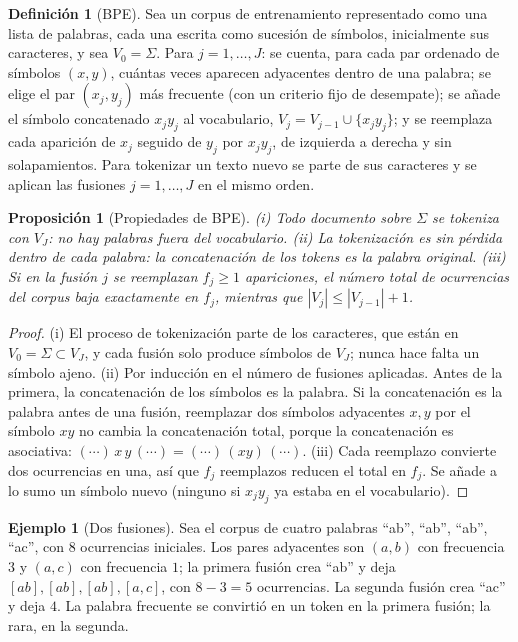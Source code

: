 \documentclass[11pt]{article}
\newtheorem{proposicion}[teorema]{Proposición}
\theoremstyle{definition}
\newtheorem{definicion}[teorema]{Definición}
\newtheorem{ejemplo}[teorema]{Ejemplo}
\theoremstyle{remark}
\newcommand{\abs}[1]{\left\lvert #1\right\rvert}
\begin{document}
\begin{definicion}[BPE]\label{def:bpe}
\noindent Sea un corpus de entrenamiento representado como una lista de palabras, cada una escrita como sucesión de símbolos, inicialmente sus caracteres, y sea $V_0=\Sigma$. Para $j=1,\dots,J$: se cuenta, para cada par ordenado de símbolos $(x,y)$, cuántas veces aparecen adyacentes dentro de una palabra; se elige el par $(x_j,y_j)$ más frecuente (con un criterio fijo de desempate); se añade el símbolo concatenado $x_jy_j$ al vocabulario, $V_j=V_{j-1}\cup\{x_jy_j\}$; y se reemplaza cada aparición de $x_j$ seguido de $y_j$ por $x_jy_j$, de izquierda a derecha y sin solapamientos. Para tokenizar un texto nuevo se parte de sus caracteres y se aplican las fusiones $j=1,\dots,J$ en el mismo orden.
\end{definicion}

\begin{proposicion}[Propiedades de BPE]\label{prop:bpe}
\noindent (i) Todo documento sobre $\Sigma$ se tokeniza con $V_J$: no hay palabras fuera del vocabulario. (ii) La tokenización es sin pérdida dentro de cada palabra: la concatenación de los tokens es la palabra original. (iii) Si en la fusión $j$ se reemplazan $f_j\ge1$ apariciones, el número total de ocurrencias del corpus baja exactamente en $f_j$, mientras que $\abs{V_j}\le\abs{V_{j-1}}+1$.
\end{proposicion}
\begin{proof}
\noindent (i) El proceso de tokenización parte de los caracteres, que están en $V_0=\Sigma\subset V_J$, y cada fusión solo produce símbolos de $V_J$; nunca hace falta un símbolo ajeno. (ii) Por inducción en el número de fusiones aplicadas. Antes de la primera, la concatenación de los símbolos es la palabra. Si la concatenación es la palabra antes de una fusión, reemplazar dos símbolos adyacentes $x,y$ por el símbolo $xy$ no cambia la concatenación total, porque la concatenación es asociativa: $(\cdots)\,x\,y\,(\cdots)=(\cdots)\,(xy)\,(\cdots)$. (iii) Cada reemplazo convierte dos ocurrencias en una, así que $f_j$ reemplazos reducen el total en $f_j$. Se añade a lo sumo un símbolo nuevo (ninguno si $x_jy_j$ ya estaba en el vocabulario).
\end{proof}

\begin{ejemplo}[Dos fusiones]\label{ej:bpe}
\noindent Sea el corpus de cuatro palabras ``ab'', ``ab'', ``ab'', ``ac'', con $8$ ocurrencias iniciales. Los pares adyacentes son $(a,b)$ con frecuencia $3$ y $(a,c)$ con frecuencia $1$; la primera fusión crea ``ab'' y deja $[ab],[ab],[ab],[a,c]$, con $8-3=5$ ocurrencias. La segunda fusión crea ``ac'' y deja $4$. La palabra frecuente se convirtió en un token en la primera fusión; la rara, en la segunda.
\end{ejemplo}
\end{document}
